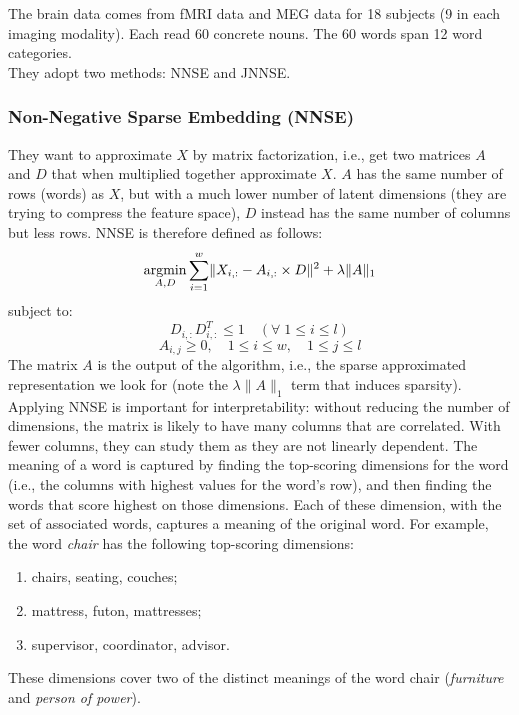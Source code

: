 The brain data comes from fMRI data and MEG data for 18 subjects (9 in each imaging modality). Each read 60 concrete nouns. The 60 words span 12 word categories.\\

They adopt two methods: NNSE and JNNSE.

\subsubsection{Non-Negative Sparse Embedding (NNSE)}
They want to approximate $X$ by matrix factorization, i.e., get two matrices $A$ and $D$ that when multiplied together approximate $X$. $A$ has the same number of rows (words) as $X$, but with a much lower number of latent dimensions (they are trying to compress the feature space), $D$ instead has the same number of columns but less rows. NNSE is therefore defined as follows:
\[
\operatorname*{argmin}_{A,D} \sum_{i=1}^w \lVert X_{i,:} - A_{i,:} \times D \rVert^2 + \lambda \lVert A\rVert_1
\]
subject to:
\[
D_{i,:}D_{i,:}^T \leq 1 \quad(\forall \;1 \leq i \leq l)
\]
\[
A_{i,j} \geq 0,\quad 1 \leq i \leq w,\quad 1 \leq j \leq l
\]
The matrix $A$ is the output of the algorithm, i.e., the sparse approximated representation we look for (note the $\lambda \lVert A\rVert_1$ term that induces sparsity).\\

Applying NNSE is important for interpretability: without reducing the number of dimensions, the matrix is likely to have many columns that are correlated. With fewer columns, they can study them as they are not linearly dependent.
The meaning of a word is captured by finding the top-scoring dimensions for the word (i.e., the columns with highest values for the word's row), and then finding the words that score highest on those dimensions. Each of these dimension, with the set of associated words, captures a meaning of the original word. For example, the word \textit{chair} has the following top-scoring dimensions: 
\begin{enumerate}
    \item chairs, seating, couches;
    \item mattress, futon, mattresses;
    \item supervisor, coordinator, advisor.
\end{enumerate}
These dimensions cover two of the distinct meanings of the word chair (\textit{furniture} and \textit{person of power}).

